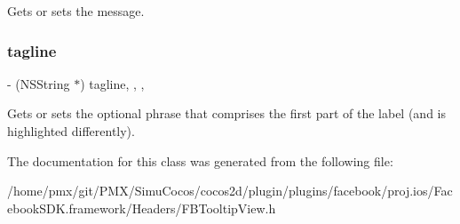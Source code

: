Gets or sets the message. \mbox{\label{interfaceFBTooltipView_aebfc88cbda9be6d5eec325a6aa8a3fa0}} 
\subsubsection{\texorpdfstring{tagline}{tagline}}
{\footnotesize\ttfamily -\/ (N\+S\+String $\ast$) tagline\hspace{0.3cm}{\ttfamily [read]}, {\ttfamily [write]}, {\ttfamily [nonatomic]}, {\ttfamily [copy]}}

Gets or sets the optional phrase that comprises the first part of the label (and is highlighted differently). 

The documentation for this class was generated from the following file\+:\begin{DoxyCompactItemize}
\item 
/home/pmx/git/\+P\+M\+X/\+Simu\+Cocos/cocos2d/plugin/plugins/facebook/proj.\+ios/\+Facebook\+S\+D\+K.\+framework/\+Headers/F\+B\+Tooltip\+View.\+h\end{DoxyCompactItemize}
